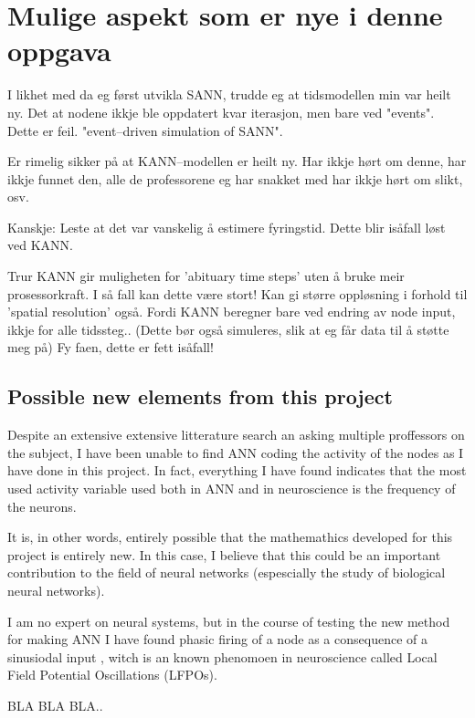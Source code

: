 	\section{ Mulige aspekt som er nye i denne oppgava }
	I likhet med da eg først utvikla SANN, trudde eg at tidsmodellen min var heilt ny. Det at nodene ikkje ble oppdatert kvar iterasjon, men bare ved "events". Dette er feil. "event--driven simulation of SANN".
	
	Er rimelig sikker på at KANN--modellen er heilt ny. Har ikkje hørt om denne, har ikkje funnet den, alle de professorene eg har snakket med har ikkje hørt om slikt, osv.
	
	Kanskje: Leste at det var vanskelig å estimere fyringstid. Dette blir isåfall løst ved KANN.

	Trur KANN gir muligheten for 'abituary time steps' uten å bruke meir prosessorkraft. I så fall kan dette være stort! Kan gi større oppløsning i forhold til 'spatial resolution' også.
	Fordi KANN beregner bare ved endring av node input, ikkje for alle tidssteg..
	(Dette bør også simuleres, slik at eg får data til å støtte meg på)  	Fy faen, dette er fett isåfall!


	\subsection{Possible new elements from this project}
	Despite an extensive extensive litterature search an asking multiple proffessors on the subject, I have been unable to find ANN coding the activity of the nodes as I have done in this project.
	In fact, everything I have found indicates that the most used activity variable used both in ANN and in neuroscience is the frequency of the neurons.
	
	It is, in other words, entirely possible that the mathemathics developed for this project is entirely new. 
	In 	this case, I believe that this could be an important contribution to the field of neural networks (espescially the study of biological neural networks).

	I am no expert on neural systems, but in the course of testing the new method for making ANN I have found phasic firing of a node as a consequence of a sinusiodal input %
	, witch is an known phenomoen in neuroscience called Local Field Potential Oscillations (LFPOs).
	
	BLA BLA BLA..

